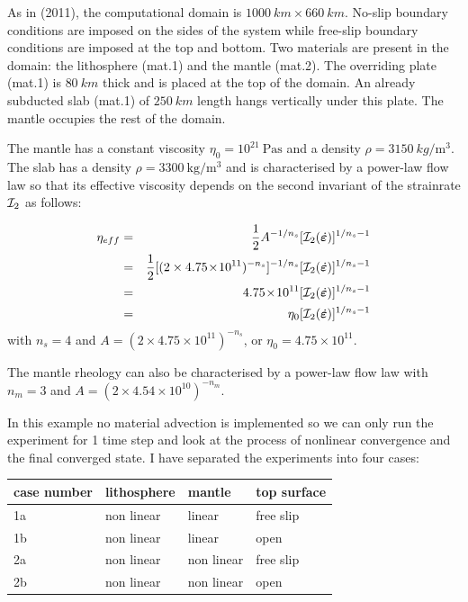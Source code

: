 As in \textcite{schm11} (2011), the computational domain is $1000~\si{km} \times 660~\si{km}$.
No-slip boundary conditions are imposed on the sides of the system while free-slip
boundary conditions are imposed at the top and bottom.
Two materials are present in the domain: the lithosphere (mat.1) and the mantle (mat.2). 
The overriding plate (mat.1) is $80~\si{km}$ thick and is placed at the top of the domain. 
An already subducted slab (mat.1) of $250~\si{km}$ length hangs vertically under this plate.
The mantle occupies the rest of the domain.

The mantle has a constant viscosity $\eta_0=10^{21}~\si{\pascal\second}$ 
and a density $\rho=3150~\si{kg\per\cubic\metre}$. 
The slab has a density $\rho=3300~\si{\kg\per\cubic\metre}$ 
and is characterised by a power-law flow law so that 
its effective viscosity depends on the second invariant of the strainrate 
${\cal I}_2$ as follows:

\begin{eqnarray}
\eta_{eff}
&=&\frac{1}{2} A^{-1/n_s} [{\cal I}_2(\dot{\bm \varepsilon})]^{1/n_s-1}  \\
&=&\frac{1}{2} [(2 \times 4.75\!\times\! 10^{11})^{-n_s}]^{-1/n_s} [{\cal I}_2(\dot{\bm \varepsilon})]   ^{1/n_s-1} \\
&=&4.75\!\times\! 10^{11} [{\cal I}_2(\dot{\bm \varepsilon})]^{1/n_s-1}  \\
&=& \eta_0 [{\cal I}_2(\dot{\bm \varepsilon})]^{1/n_s-1} 
\end{eqnarray}
with 
$n_s=4$ and $A=(2 \times 4.75\!\times\! 10^{11})^{-n_s}$, or $\eta_0=4.75\times 10^{11}$.


The mantle rheology can also be characterised by a power-law flow law with 
$n_m=3$ and $A=(2 \times 4.54\!\times\! 10^{10})^{-n_m}$.

In this example no material advection is implemented so we can only run the experiment for 1
time step and look at the process of nonlinear convergence and the final converged state.
I have separated the experiments into four cases:
\begin{center}
\begin{tabular}{llll}
\hline
case number & lithosphere & mantle & top surface \\
\hline\hline
1a & non linear & linear     & free slip  \\
1b & non linear & linear     & open\\
2a & non linear & non linear & free slip\\
2b & non linear & non linear & open \\ 
\hline
\end{tabular}
\end{center}

